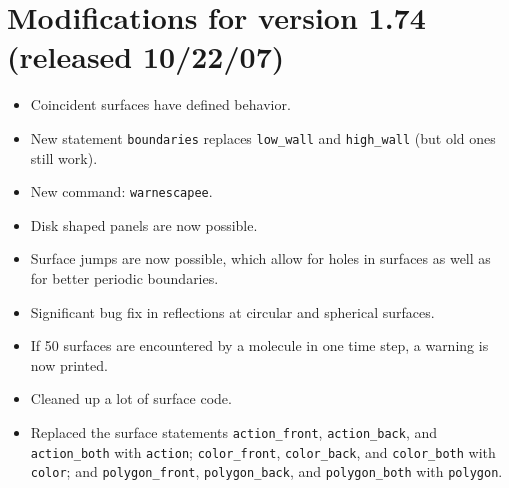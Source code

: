 \documentclass {scrbook}
\newcommand {\ttt} {\texttt}
\begin{document}
\section{Modifications for version 1.74 (released 10/22/07)}
\begin{itemize}
\item Coincident surfaces have defined behavior.
\item New statement \ttt{boundaries} replaces \ttt{low\_wall} and \ttt{high\_wall} (but old ones still work).
\item New command: \ttt{warnescapee}.
\item Disk shaped panels are now possible.
\item Surface jumps are now possible, which allow for holes in surfaces as well as for better periodic boundaries.
\item Significant bug fix in reflections at circular and spherical surfaces.
\item If 50 surfaces are encountered by a molecule in one time step, a warning is now printed.
\item Cleaned up a lot of surface code.
\item Replaced the surface statements \ttt{action\_front}, \ttt{action\_back}, and \ttt{action\_both} with \ttt{action}; \ttt{color\_front}, \ttt{color\_back}, and \ttt{color\_both} with \ttt{color}; and \ttt{polygon\_front}, \ttt{polygon\_back}, and \ttt{polygon\_both} with \ttt{polygon}.
\end{itemize}
\end{document}
